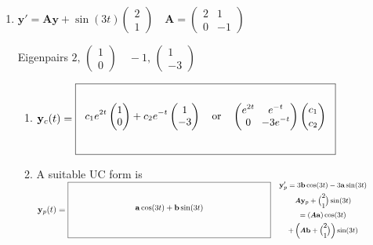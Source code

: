\documentclass[12pt,letterpaper]{article}
\newcommand{\vect}[1]{\mathbf{#1}}
\newcommand{\mat}[1]{\bm{#1}}
\newcommand{\KeyBox}[3]{%
  \vcenter{\hbox{$\boxed{%
    \rule{0pt}{#2}\makebox[#1][c]{%
      \smash{\raisebox{\dimexpr#2/2\relax}{%
        \small\setlength{\arraycolsep}{3pt}\renewcommand{\arraystretch}{0.95}%
        $\vcenter{\hbox{$\displaystyle #3$}}$}}}}$}}}
\newcommand{\KeySide}[2]{\quad\vcenter{\hbox{\parbox{#1}{\footnotesize\setlength{\arraycolsep}{2pt}\ensuremath{\begin{gathered}#2\end{gathered}}}}}}
\begin{document}
\begin{enumerate}
\begin{enumerate}
\item To satisfy the IC you would row reduce
\par\noindent $\mat{M}_{\text{\textsc{ic}}}=\KeyBox{1.8in}{0.80in}{\left[\begin{array}{rr|r}1&0&1-a_1\\0&-2&3-a_2\end{array}\right]}\KeySide{3.2in}{\vect{y}_c(0)=\binom{c_1}{-2c_2},\quad \vect{y}_p(0)=\binom{a_1}{a_2}\\\vect{y}_c(0)+\vect{y}_p(0)=\binom{1}{3}}$\par
\end{enumerate}

\newpage
\item[]
$\vect{y}'=\mat{A}\vect{y}+\sin(3t)\begin{pmatrix}2\\1\end{pmatrix}\quad
\mat{A}=\begin{pmatrix}2&1\\0&-1\end{pmatrix}$
\par Eigenpairs $2,\,\begin{pmatrix}1\\0\end{pmatrix}\quad
-1,\,\begin{pmatrix}1\\-3\end{pmatrix}$
\begin{enumerate}
\item $\vect{y}_c(t)=\KeyBox{3.2in}{0.80in}{\resizebox{3.05in}{!}{$\displaystyle c_1e^{2t}\begin{pmatrix}1\\0\end{pmatrix}+c_2e^{-t}\begin{pmatrix}1\\-3\end{pmatrix}\quad\text{or}\quad \begin{pmatrix}e^{2t}&e^{-t}\\0&-3e^{-t}\end{pmatrix}\binom{c_1}{c_2}$}}$
\item A suitable UC form is
\newline
$\vect{y}_p(t)=\KeyBox{3.2in}{0.80in}{\vect{a}\cos(3t)+\vect{b}\sin(3t)}\KeySide{2.45in}{\vect{y}_p'=3\vect{b}\cos(3t)-3\vect{a}\sin(3t)\\\mat{A}\vect{y}_p+\binom{2}{1}\sin(3t)\\=(\mat{A}\vect{a})\cos(3t)\\+\left(\mat{A}\vect{b}+\binom{2}{1}\right)\sin(3t)}$

\end{enumerate}
\end{enumerate}
\end{document}
